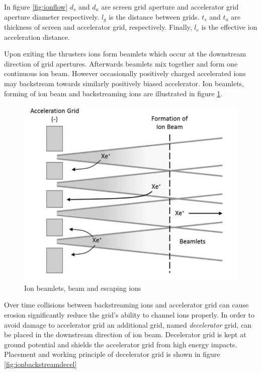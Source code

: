 In figure \ref{fig:ionflow} $d_s$ and $d_a$ are screen grid aperture and accelerator grid aperture diameter respectively. $l_g$ is the distance between grids. $t_s$ and $t_a$ are thickness of screen and accelerator grid, respectively. Finally, $l_e$ is the effective ion acceleration distance. 

Upon exiting the thrusters ions form beamlets which occur at the downstream direction of grid apertures. Afterwards beamlets mix together and form one continuous ion beam. However occasionally positively charged accelerated ions may backstream towards similarly positively biased accelerator. Ion beamlets, forming of ion beam and backstreaming ions are illustrated in figure \ref{fig:ionbackstream}.

\begin{figure}[ht]
    \centering
    \includegraphics[scale=0.6]{fig/ionbackstream.png}
    \caption[Ion beamlets, beam and escaping ions]{Ion beamlets, beam and escaping ions\cite{Couch2017}}
    \label{fig:ionbackstream}
\end{figure}
Over time collisions between backstreaming ions and accelerator grid can cause erosion significantly reduce the grid's ability to channel ions properly. In order to avoid damage to accelerator grid an additional grid, named \textit{decelerator} grid, can be placed in the downstream direction of ion beam. Decelerator grid is kept at ground potential and shields the accelerator grid from high energy impacts. Placement and working principle of decelerator grid is shown in figure \ref{fig:ionbackstreamdecel}

